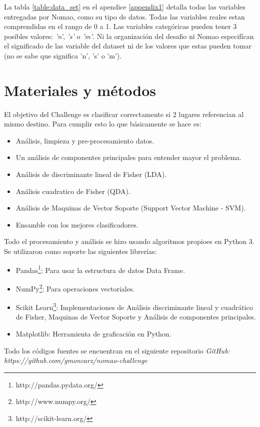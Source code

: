 \documentclass[journal]{IEEEtran}
\begin{document}
La tabla \ref{table:data_set} en el apendice \ref{appendix1} detalla todas las variables entregadas por 
Nomao, como su tipo de datos. Todas las variables reales estan comprendidas
en el rango de 0 a 1. Las variables
categóricas pueden tener 3 posibles valores: \textit{'n'}, \textit{'s'} 
o \textit{'m'}. Ni la organización del desafio ni Nomao especifícan 
el significado de las variable del dataset ni de los valores
que estas pueden tomar (no se sabe que significa 'n', 's' o 'm').


\section{Materiales y métodos}

El objetivo del Challenge es clasificar correctamente si 2 lugares
referencian al mismo destino. Para cumplir esto lo que básicamente se hace es:
\begin{itemize}
\item Análisis, limpieza y pre-procesamiento datos. 
\item Un análisis de componentes principales para entender mayor el problema. 
\item Análisis de discriminante lineal de Fisher (LDA).
\item Análisis cuadratico de Fisher (QDA).
\item Análisis de Maquinas de Vector Soporte (Support Vector Machine - SVM).
\item Ensamble con los mejores clasificadores.
\end{itemize}

Todo el procesamiento y análisis se hizo usando algoritmos propioes en Python 3. Se
utilizaron como soporte las siguientes librerías:
\begin{itemize}
\item Pandas\footnote{http://pandas.pydata.org/}: Para usar la estructura de datos Data Frame.
\item NumPy\footnote{http://www.numpy.org/}: Para operaciones vectoriales.
\item Scikit Learn\footnote{http://scikit-learn.org/}: Implementaciones de Análisis discriminante lineal
	y cuadrático de Fisher, Maquinas de Vector Soporte y Análisis
	de componentes principales.
\item Matplotlib: Herramienta de graficación en Python.
\end{itemize}

Todo los códigos fuentes se encuentran en el siguiente repositorio
\textit{GitHub: https://github.com/gmoncarz/nomao-challenge}
\end{document}
